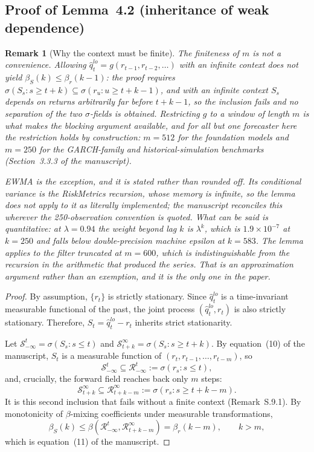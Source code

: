 \documentclass[preprint,11pt,authoryear]{elsarticle}
\newtheorem{remark}[theorem]{Remark}
\newcommand{\1}{\boldsymbol{1}}
\begin{document}
\subsection{Proof of Lemma~4.2 (inheritance of weak dependence)}
\label{app:lem_score_mixing}

\begin{remark}[Why the context must be finite]
	\label{rem:finite_context}
	The finiteness of $m$ is not a convenience. Allowing
	$\hat q_t^{lo}=g(r_{t-1},r_{t-2},\ldots)$ with an infinite context does not
	yield $\beta_S(k)\le\beta_r(k-1)$: the proof requires
	$\sigma(S_s : s\ge t+k)\subseteq\sigma(r_u : u\ge t+k-1)$, and with an
	infinite context $S_s$ depends on returns arbitrarily far before $t+k-1$,
	so the inclusion fails and no separation of the two $\sigma$-fields is
	obtained. Restricting $g$ to a window of length $m$ is what makes the
	blocking argument available, and for all but one forecaster here the
	restriction holds by construction: $m = 512$ for the foundation models and
	$m = 250$ for the GARCH-family and historical-simulation benchmarks
	(Section~3.3.3 of the manuscript).

	EWMA is the exception, and it is stated rather than rounded off. Its
	conditional variance is the RiskMetrics recursion, whose memory is infinite,
	so the lemma does not apply to it as literally implemented; the manuscript
	reconciles this wherever the 250-observation convention is quoted. What can be
	said is quantitative: at $\lambda = 0.94$ the weight beyond lag $k$ is
	$\lambda^k$, which is $1.9\times10^{-7}$ at $k = 250$ and falls below
	double-precision machine epsilon at $k = 583$. The lemma applies to the filter
	truncated at $m = 600$, which is indistinguishable from the recursion in the
	arithmetic that produced the series. That is an approximation argument rather
	than an exemption, and it is the only one in the paper.
\end{remark}

\begin{proof}
	By assumption, $\{r_t\}$ is strictly stationary. Since $\hat q_t^{lo}$ is
	a time-invariant measurable functional of the past, the joint process
	$(\hat q_t^{lo},r_t)$ is also strictly stationary. Therefore,
	$S_t=\hat q_t^{lo}-r_t$ inherits strict stationarity.
	
	Let $\mathcal S_{-\infty}^t=\sigma(S_s:s\le t)$ and
	$\mathcal S_{t+k}^{\infty}=\sigma(S_s:s\ge t+k)$. By
	equation~(10) of the manuscript, $S_t$ is a measurable function of
	$(r_t,r_{t-1},\ldots,r_{t-m})$, so
	\[
	\mathcal S_{-\infty}^t
	\subseteq
	\mathcal R_{-\infty}^t:=\sigma(r_s:s\le t),
	\]
	and, crucially, the forward field reaches back only $m$ steps:
	\[
	\mathcal S_{t+k}^{\infty}
	\subseteq
	\mathcal R_{t+k-m}^{\infty}:=\sigma(r_s:s\ge t+k-m).
	\]
	It is this second inclusion that fails without a finite context
	(Remark~S.9.1).
	By monotonicity of $\beta$-mixing coefficients under measurable
	transformations,
	\[
	\beta_S(k)
	\le
	\beta(\mathcal R_{-\infty}^t,\mathcal R_{t+k-m}^{\infty})
	=
	\beta_r(k-m),
	\qquad k>m,
	\]
	which is equation~(11) of the manuscript.
\end{proof}
\end{document}
